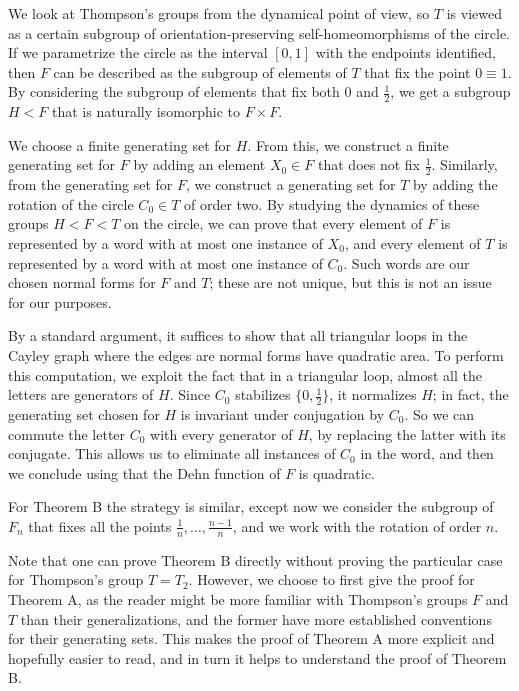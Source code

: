 \documentclass[10pt,a4paper]{article}
\begin{document}
We look at Thompson's groups from the dynamical point of view, so $T$ is viewed as a certain subgroup of orientation-preserving self-homeomorphisms of the circle. If we parametrize the circle as the interval $[0,1]$ with the endpoints identified, then $F$ can be described as the subgroup of elements of $T$ that fix the point $0\equiv 1$. By considering the subgroup of elements that fix both $0$ and $\frac12$, we get a subgroup $H<F$ that is naturally isomorphic to $F\times F$.

We choose a finite generating set for $H$. From this, we construct a finite generating set for $F$ by adding an element $X_0\in F$ that does not fix $\frac12$. Similarly, from the generating set for $F$, we construct a generating set for $T$ by adding the rotation of the circle $C_0\in T$ of order two. By studying the dynamics of these groups $H<F<T$ on the circle, we can prove that every element of $F$ is represented by a word with at most one instance of $X_0$, and every element of $T$ is represented by a word with at most one instance of $C_0$. Such words are our chosen normal forms for $F$ and $T$; these are not unique, but this is not an issue for our purposes.

By a standard argument, it suffices to show that all triangular loops in the Cayley graph where the edges are normal forms have quadratic area. To perform this computation, we exploit the fact that in a triangular loop, almost all the letters are generators of $H$. Since $C_0$ stabilizes $\{0,\frac12\}$, it normalizes $H$; in fact, the generating set chosen for $H$ is invariant under conjugation by $C_0$. So we can commute the letter $C_0$ with every generator of $H$, by replacing the latter with its conjugate. This allows us to eliminate all instances of $C_0$ in the word, and then we conclude using that the Dehn function of $F$ is quadratic.

For Theorem B the strategy is similar, except now we consider the subgroup of $F_n$ that fixes all the points $\frac1n,\ldots,\frac{n-1}{n}$, and we work with the rotation of order $n$.

Note that one can prove Theorem B directly without proving the particular case for Thompson's group $T=T_2$. However, we choose to first give the proof for Theorem A, as the reader might be more familiar with Thompson's groups $F$ and $T$ than their generalizations, and the former have more established conventions for their generating sets. This makes the proof of Theorem A more explicit and hopefully easier to read, and in turn it helps to understand the proof of Theorem B.
\end{document}
